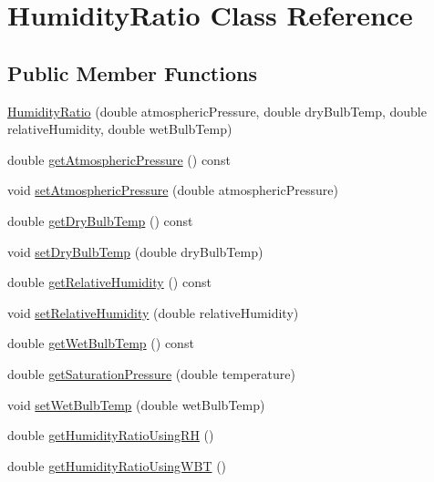 \hypertarget{class_humidity_ratio}{}\section{Humidity\+Ratio Class Reference}
\label{class_humidity_ratio}
\subsection*{Public Member Functions}
\begin{DoxyCompactItemize}
\item 
\hyperlink{class_humidity_ratio_a504da4363c7291a09107360de2ee709a}{Humidity\+Ratio} (double atmospheric\+Pressure, double dry\+Bulb\+Temp, double relative\+Humidity, double wet\+Bulb\+Temp)
\item 
double \hyperlink{class_humidity_ratio_a7814687795a87a3822e4584773938741}{get\+Atmospheric\+Pressure} () const
\item 
void \hyperlink{class_humidity_ratio_aebab92be0c5eb4f23baaeb7268dad87e}{set\+Atmospheric\+Pressure} (double atmospheric\+Pressure)
\item 
double \hyperlink{class_humidity_ratio_a737b2faf32e5271b8062b175e1d018a9}{get\+Dry\+Bulb\+Temp} () const
\item 
void \hyperlink{class_humidity_ratio_a291bccce6b8665412987a31bd2633d9a}{set\+Dry\+Bulb\+Temp} (double dry\+Bulb\+Temp)
\item 
double \hyperlink{class_humidity_ratio_af761b52e96bdf995e1a2bbbfd9e3b47f}{get\+Relative\+Humidity} () const
\item 
void \hyperlink{class_humidity_ratio_a110aecb6587a836ab76d4aca840e5759}{set\+Relative\+Humidity} (double relative\+Humidity)
\item 
double \hyperlink{class_humidity_ratio_adbadf93878e4867ce283319859d04087}{get\+Wet\+Bulb\+Temp} () const
\item 
double \hyperlink{class_humidity_ratio_a29d3152c2f14fd47f9ee34c0787049cf}{get\+Saturation\+Pressure} (double temperature)
\item 
void \hyperlink{class_humidity_ratio_a5bda925f783cb4cef848245b00e28e29}{set\+Wet\+Bulb\+Temp} (double wet\+Bulb\+Temp)
\item 
double \hyperlink{class_humidity_ratio_af711463f09fa91544c2b69dc24817fed}{get\+Humidity\+Ratio\+Using\+RH} ()
\item 
double \hyperlink{class_humidity_ratio_ad33fa981783bae96c17171f12b9cf2bd}{get\+Humidity\+Ratio\+Using\+W\+BT} ()
\end{DoxyCompactItemize}


